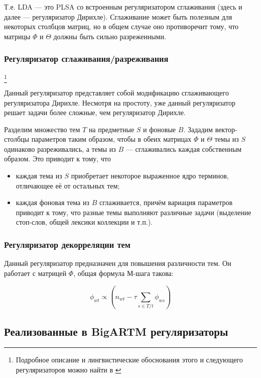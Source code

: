 Т.е. LDA --- это PLSA со встроенным регуляризатором сглаживания (здесь и далее --- регуляризатор Дирихле). Сглаживание может быть полезным для некоторых столбцов матриц, но в общем случае оно противоречит тому, что матрицы $\Phi$ и $\Theta$ должны быть сильно разреженными. 

\subsubsection{Регуляризатор сглаживания/разреживания}\label{smooth_sparse}
\footnote{Подробное описание и лингвистические обоснования этого и следующего регуляризаторов можно найти в \cite{voron_potap_14}}

 Данный регуляризатор представляет собой модификацию сглаживающего регуляризатора Дирихле. Несмотря на простоту, уже данный регуляризатор решает задачи более сложные, чем регуляризатор Дирихле.

Разделим множество тем $T$ на предметные $S$ и фоновые $B$. Зададим вектор-столбцы параметров таким образом, чтобы в обеих матрицах $\Phi$ и $\Theta$ темы из $S$ одинаково разреживались, а темы из $B$ --- сглаживались каждая собственным образом. Это приводит к тому, что 

\begin{itemize}
	\item каждая тема из $S$ приобретает некоторое выраженное ядро терминов, отличающее её от остальных тем;
	\item каждая фоновая тема из $B$ сглаживается, причём вариация параметров приводит к тому, что разные темы выполняют различные задачи (выделение стоп-слов, общей лексики коллекции и т.п.).
\end{itemize}  


\subsubsection{Регуляризатор декорреляции тем}\label{decor}

Данный регуляризатор предназначен для повышения различности тем. 
Он работает с матрицей $\Phi$, общая формула М-шага такова:

\begin{equation}
\phi_{wt} \propto \left( n_{wt} - \tau \sum_{s \in T/{t}} \phi_{ws} \right)
\end{equation}

\subsection{Реализованные в BigARTM регуляризаторы}

